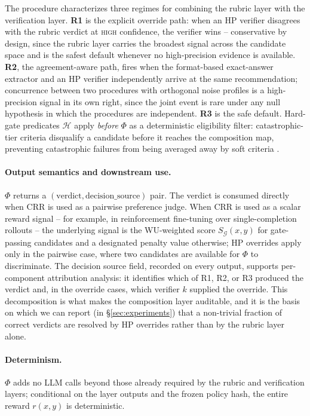 \noindent
The procedure characterizes three regimes for combining the rubric
layer with the verification layer.  \textbf{R1} is the explicit
override path: when an HP verifier disagrees with the rubric verdict
at \textsc{high} confidence, the verifier wins -- conservative by
design, since the rubric layer carries the broadest signal across the
candidate space and is the safest default whenever no high-precision
evidence is available.  \textbf{R2}, the agreement-aware path, fires
when the format-based exact-answer extractor and an HP verifier
independently arrive at the same recommendation; concurrence between
two procedures with orthogonal noise profiles is a high-precision
signal in its own right, since the joint event is rare under any
null hypothesis in which the procedures are independent.
\textbf{R3} is the safe default.  Hard-gate predicates $\mathcal{H}$
apply \emph{before} $\Phi$ as a deterministic eligibility filter:
catastrophic-tier criteria disqualify a candidate before it reaches
the composition map, preventing catastrophic failures from being
averaged away by soft criteria \citep{bai2022constitutional}.

\paragraph{Output semantics and downstream use.}
$\Phi$ returns a $(\text{verdict}, \text{decision\_source})$ pair.
The verdict is consumed directly when CRR is used as a pairwise
preference judge.  When CRR is used as a scalar reward signal -- for
example, in reinforcement fine-tuning over single-completion rollouts
-- the underlying signal is the WU-weighted score
$S_{\mathcal{G}}(x, y)$ for gate-passing candidates and a designated
penalty value otherwise; HP overrides apply only in the pairwise
case, where two candidates are available for $\Phi$ to discriminate.
The decision source field, recorded on every output, supports
per-component attribution analysis: it identifies which of R1, R2, or
R3 produced the verdict and, in the override cases, which verifier
$k$ supplied the override.  This decomposition is what makes the
composition layer auditable, and it is the basis on which we can
report (in \S\ref{sec:experiments}) that a non-trivial fraction of
correct verdicts are resolved by HP overrides rather than by the
rubric layer alone.

\paragraph{Determinism.}
$\Phi$ adds no LLM calls beyond those already required by the rubric
and verification layers; conditional on the layer outputs and the
frozen policy hash, the entire reward $r(x, y)$ is deterministic.

